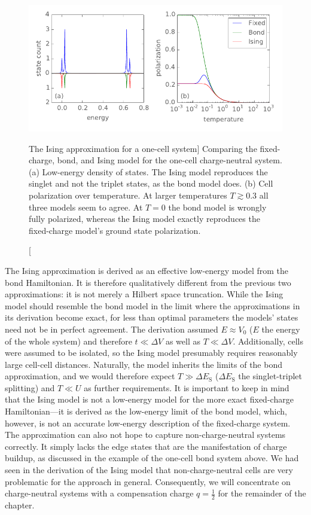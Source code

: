 %
\begin{figure}
  \center
  \includegraphics{ising_approximation1}
  \caption
  [The Ising approximation for a one-cell system]
  {
  \label{fig:ising_approximation1}
  Comparing the fixed-charge, bond, and Ising model for the one-cell
  charge-neutral  system. (a) Low-energy density of states. The Ising model
  reproduces the singlet and not the triplet states, as the bond model does. (b)
  Cell polarization over temperature. At larger temperatures $T \gtrsim 0.3$ all
  three models seem to agree. At $T = 0$ the bond model is wrongly fully
  polarized, whereas the Ising model exactly reproduces the fixed-charge model's
  ground state polarization.
  }
\end{figure}
%
The Ising approximation is derived as an effective low-energy model from the
bond Hamiltonian. It is therefore qualitatively different from the previous two
approximations: it is not merely a Hilbert space truncation. While the Ising
model should resemble the bond model in the limit where the approximations in
its derivation become exact, for less than optimal parameters the models' states
need not be in perfect agreement. The derivation assumed $E \approx V_0$ ($E$
the energy of the whole system) and therefore $t \ll \Delta V$ as well as $T \ll
\Delta V$. Additionally, cells were assumed to be isolated, so the Ising model
presumably requires reasonably large cell-cell distances. Naturally, the model
inherits the limits of the bond approximation, and we would therefore expect $T
\gg \Delta E_\text{S}$ ($\Delta E_\text{S}$ the singlet-triplet splitting) and $T \ll U$ as
further requirements. It is important to keep in mind that the Ising model is
not a low-energy model for the more exact fixed-charge Hamiltonian---it is
derived as the low-energy limit of the bond model, which, however, is not an
accurate low-energy description of the fixed-charge system. The approximation
can also not hope to capture non-charge-neutral systems correctly. It simply
lacks the edge states that are the manifestation of charge buildup, as discussed
in the example of the one-cell bond system above. We had seen in the derivation
of the Ising model that non-charge-neutral cells are very problematic for the
 approach in general. Consequently, we will concentrate on
charge-neutral systems with a compensation charge $q = \frac{1}{2}$ for the
remainder of the chapter.

